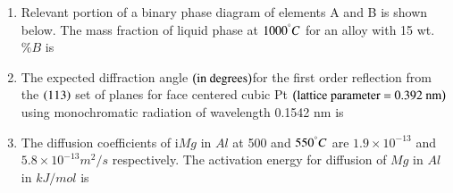 \documentclass[journal,12pt,onecolumn]{IEEEtran}
\theoremstyle{remark}
\begin{document}
\begin{enumerate}
        \hfill{}

    \item Relevant portion of a binary phase diagram of elements A and B is shown below. The mass fraction
        of liquid phase at $1000 ^ {\degree}C$ for an alloy with 15 wt.$\% B$ is
        \hfill{}
        \begin{center}
            \resizebox{0.5\textwidth}{!}{%
                           
                }%
        \end{center}
    \item The expected diffraction angle $\left(\textnormal{in degrees}\right)$for the first order reflection from the $\left(113\right)$ set of planes
        for face centered cubic Pt $\left(\textnormal{lattice parameter = 0.392 nm}\right)$ using monochromatic radiation of
        wavelength 0.1542 nm is
        \hfill{}
    \item The diffusion coefficients of i$Mg$ in $Al$ at 500 and $550^{\degree}C$ are $1.9\times 10^{-13}$
        and $5.8\times 10^{-13} m^2/s$ respectively. The activation energy for diffusion of $Mg$ in $Al$ in $kJ/mol$ is
        \hfill{}
\end{enumerate}
\end{document}
